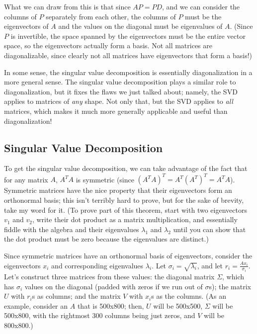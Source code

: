 \documentclass[11pt]{article}
\begin{document}
What we can draw from this is that since $AP = PD$, and we can consider the columns of $P$
separately from each other, the columns of $P$ must be the eigenvectors of $A$ and the values on the
diagonal must be eigenvalues of $A$. (Since $P$ is invertible, the space spanned by the eigenvectors
must be the entire vector space, so the eigenvectors actually form a basis. Not all matrices are
diagonalizable, since clearly not all matrices have eigenvectors that form a basis!)

In some sense, the singular value decomposition is essentially diagonalization in a more general
sense. The singular value decomposition plays a similar role to diagonalization, but it fixes the
flaws we just talked about; namely, the SVD applies to matrices of \emph{any} shape. Not only that,
but the SVD applies to \emph{all} matrices, which makes it much more generally applicable and useful
than diagonalization!

\subsection*{Singular Value Decomposition}

To get the singular value decomposition, we can take advantage of the fact that for any matrix $A$,
$A^TA$ is symmetric (since $(A^TA)^T = A^T(A^T)^T = A^TA$). Symmetric matrices have the nice
property that their eigenvectors form an orthonormal basis; this isn't terribly hard to prove, but
for the sake of brevity, take my word for it. (To prove part of this theorem, start with two
eigenvectors $v_1$ and $v_2$, write their dot product as a matrix multiplication, and essentially
fiddle with the algebra and their eigenvalues $\lambda_1$ and $\lambda_2$ until you can show that
the dot product must be zero because the eigenvalues are distinct.)

Since symmetric matrices have an orthonormal basis of eigenvectors, consider the eigenvectors $x_i$
and corresponding eigenvalues $\lambda_i$. Let $\sigma_i = \sqrt{\lambda_i}$, and let 
$r_i = \frac{A x_i}{\sigma_i}$. Let's construct three matrices from these values: the diagonal
matrix $\Sigma$, which has  $\sigma_i$ values on the diagonal (padded with zeros if we run out of
$\sigma$s); the matrix $U$ with $r_i$s as columns; and the matrix $V$ with $x_i$s as the columns. 
(As an example, consider an $A$ that is 500x800; then, $U$ will be 500x500, $\Sigma$ will be
500x800, with the rightmost 300 columns being just zeros, and $V$ will be 800x800.)
\end{document}
